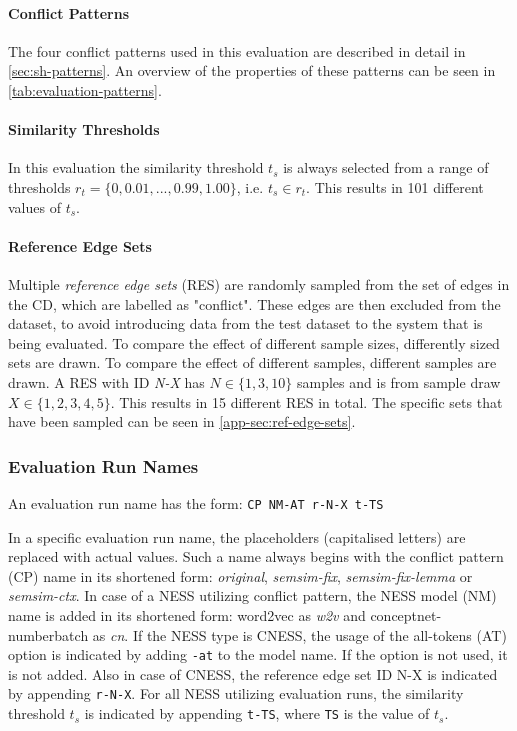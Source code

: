 \documentclass[11pt]{scrreprt}
\begin{document}
\paragraph{Conflict Patterns}
The four conflict patterns used in this evaluation are described in detail in \cref{sec:sh-patterns}. An overview of the properties of these patterns can be seen in \cref{tab:evaluation-patterns}.


\paragraph{Similarity Thresholds}
In this evaluation the similarity threshold \(t_s\) is always selected from a range of thresholds \(r_t = \{0, 0.01, ...,  0.99, 1.00\}\), i.e. \(t_s \in r_t\). This results in 101 different values of \(t_s\).


\paragraph{Reference Edge Sets}
Multiple \textit{reference edge sets} (RES)  are randomly sampled from the set of edges in the CD, which are labelled as "conflict". These edges are then excluded from the dataset, to avoid introducing data from the test dataset to the system that is being evaluated. To compare the effect of different sample sizes, differently sized sets are drawn. To compare the effect of different samples, different samples are drawn. A RES with ID \textit{N-X} has \(N \in \{1, 3, 10\}\) samples and is from sample draw \(X \in \{1, 2, 3, 4, 5\}\). This results in 15 different RES in total. The specific sets that have been sampled can be seen in \cref{app-sec:ref-edge-sets}.


\subsubsection{Evaluation Run Names}
\label{sec:eval-run-names}
An evaluation run name has the form: \texttt{CP NM-AT r-N-X t-TS}

In a specific evaluation run name, the placeholders (capitalised letters) are replaced with actual values. Such a name always begins with the conflict pattern (CP) name in its shortened form: \textit{original}, \textit{semsim-fix}, \textit{semsim-fix-lemma} or \textit{semsim-ctx}. In case of a NESS utilizing conflict pattern, the NESS model (NM) name is added in its shortened form: word2vec as \textit{w2v} and conceptnet-numberbatch as \textit{cn}. If the NESS type is CNESS, the usage of the all-tokens (AT) option is indicated by adding \texttt{-at} to the model name. If the option is not used, it is not added. Also in case of CNESS, the reference edge set ID N-X is indicated by appending \texttt{r-N-X}. For all NESS utilizing evaluation runs, the similarity threshold \(t_s\) is indicated by appending \texttt{t-TS}, where \texttt{TS} is the value of \(t_s\).
\end{document}
